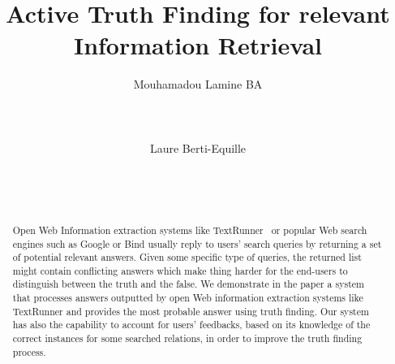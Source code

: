 \documentclass{sig-alternate}
\begin{document}
\conferenceinfo{}{}

\title{Active Truth Finding for relevant Information Retrieval}

\author{
\alignauthor
Mouhamadou Lamine BA\\
       \\
       \\
       \\
\alignauthor
Laure Berti-Equille\\
       \\
       \\
       \\
}


\maketitle
\begin{abstract}
Open Web Information extraction systems like TextRunner~\cite{Yates07}
or popular Web search engines such as Google or Bind usually reply to
users' search queries by returning a set of potential relevant answers. Given
some specific type of queries, the returned list might contain conflicting answers
which make thing harder for the end-users to distinguish between the truth and 
the false.
We demonstrate in the paper a system that processes answers outputted 
by open Web information extraction systems like TextRunner and provides 
the most probable answer using truth finding. Our system has also the 
capability to account for users' feedbacks, based on its knowledge of the 
correct instances for some searched relations, in order to improve the truth
finding process.
\end{abstract}




\end{document}

